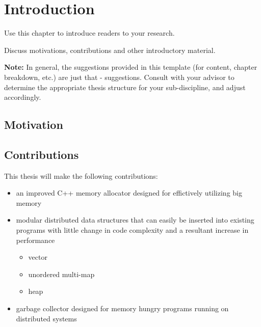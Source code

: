 \chapter{Introduction}

Use this chapter to introduce readers to your research. 

Discuss motivations, contributions and other introductory material.

\textbf{Note:} In general, the suggestions provided in this template (for content, chapter breakdown, etc.) are just that - suggestions. Consult with your advisor to determine the appropriate thesis structure for your sub-discipline, and adjust accordingly.

\section{Motivation}

\section{Contributions}
This thesis will make the following contributions:
    \begin{itemize}
        \item an improved C++ memory allocator designed for effictively utilizing big memory
        \item modular distributed data structures that can easily be inserted into existing programs with little change in code complexity and a resultant increase in performance
            \begin{itemize}
                \item vector
                \item unordered multi-map
                \item heap
            \end{itemize}
        \item garbage collector designed for memory hungry programs running on distributed systems
    \end{itemize}
    